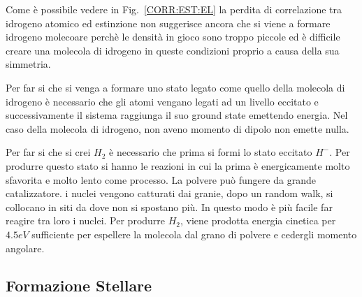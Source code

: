 Come \`e possibile vedere in Fig.~\ref{CORR:EST:EL} la perdita di correlazione tra idrogeno atomico ed estinzione non suggerisce ancora che si viene a formare idrogeno molecoare perch\`e le densit\`a in gioco sono troppo piccole ed \`e difficile creare una molecola di idrogeno in queste condizioni proprio a causa della sua simmetria.

Per far si che si venga a formare uno stato legato come quello della molecola di idrogeno \`e necessario che gli atomi vengano legati ad un livello eccitato e successivamente il sistema raggiunga il suo ground state emettendo energia. Nel caso della molecola di idrogeno, non aveno momento di dipolo non emette nulla.

Per far si che si crei $H_2$ \`e necessario che prima si formi lo stato eccitato $H^-$. Per produrre questo stato si hanno le reazioni
in cui la prima \`e energicamente molto sfavorita e molto lento come processo.
La polvere pu\`o fungere da grande catalizzatore. i nuclei vengono catturati dai granie, dopo un random walk, si collocano in siti da dove non si spostano pi\`u. In questo modo \`e pi\`u facile far reagire tra loro i nuclei. Per produrre $H_2$, viene prodotta energia cinetica per $4.5eV$ sufficiente per espellere la molecola dal grano di polvere e cedergli momento angolare.

\subsection{Formazione Stellare}
















